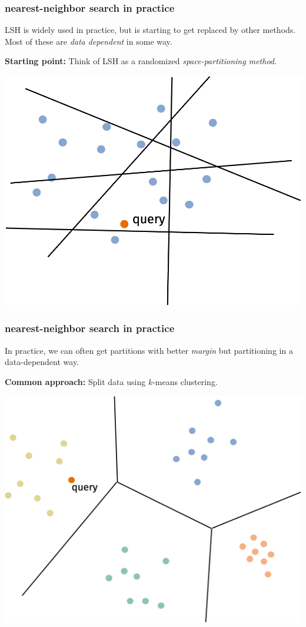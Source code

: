 \documentclass[compress]{beamer}
\begin{document}
\begin{frame}[t]
	\frametitle{nearest-neighbor search in practice}
	LSH is widely used in practice, but is starting to get replaced by other methods. Most of these are \emph{data dependent} in some way. 

	\textbf{Starting point:} Think of LSH as a randomized \emph{space-partitioning method}.
	\begin{center}
	\includegraphics[width=.6\textwidth]{random_space_partition.png}
	\end{center}

\end{frame}

\begin{frame}[t]
	\frametitle{nearest-neighbor search in practice}
In practice, we can often get partitions with better \emph{margin} but partitioning in a data-dependent way. 

	\textbf{Common approach:} Split data using $k$-means clustering. 
	\begin{center}
	\includegraphics[width=.6\textwidth]{kmeans_1.png}
	\end{center}

\end{frame}
\end{document}
